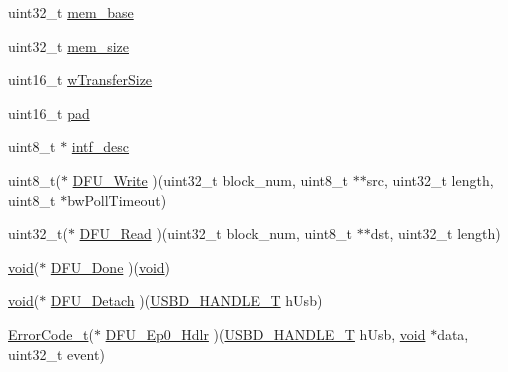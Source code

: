 \begin{DoxyCompactItemize}
\item 
uint32\-\_\-t \hyperlink{structUSBD__DFU__INIT__PARAM_a00d172e271b0f2272b052f479c3d2439}{mem\-\_\-base}
\item 
uint32\-\_\-t \hyperlink{structUSBD__DFU__INIT__PARAM_a4624ef53dbdf39e27314fa7b19d6720d}{mem\-\_\-size}
\item 
uint16\-\_\-t \hyperlink{structUSBD__DFU__INIT__PARAM_a497bbbfa6751823b9e288c257456b56f}{w\-Transfer\-Size}
\item 
uint16\-\_\-t \hyperlink{structUSBD__DFU__INIT__PARAM_a12378565018adc1588b6fd4f12e3a5dc}{pad}
\item 
uint8\-\_\-t $\ast$ \hyperlink{structUSBD__DFU__INIT__PARAM_ac124783c4a9188405cdb87399aa067ce}{intf\-\_\-desc}
\item 
uint8\-\_\-t($\ast$ \hyperlink{structUSBD__DFU__INIT__PARAM_a1494ee2021466b24bcf4f02800be33b2}{D\-F\-U\-\_\-\-Write} )(uint32\-\_\-t block\-\_\-num, uint8\-\_\-t $\ast$$\ast$src, uint32\-\_\-t length, uint8\-\_\-t $\ast$bw\-Poll\-Timeout)
\item 
uint32\-\_\-t($\ast$ \hyperlink{structUSBD__DFU__INIT__PARAM_ad2d13b52a973cf0e83a6bc509b61c46c}{D\-F\-U\-\_\-\-Read} )(uint32\-\_\-t block\-\_\-num, uint8\-\_\-t $\ast$$\ast$dst, uint32\-\_\-t length)
\item 
\hyperlink{Paradigm_2Tern__EE_2small_2portmacro_8h_a14d32f8130d3c0b212cfc751730b5b49}{void}($\ast$ \hyperlink{structUSBD__DFU__INIT__PARAM_acab8981342b48fbc9b53503dd0161f0c}{D\-F\-U\-\_\-\-Done} )(\hyperlink{Paradigm_2Tern__EE_2small_2portmacro_8h_a14d32f8130d3c0b212cfc751730b5b49}{void})
\item 
\hyperlink{Paradigm_2Tern__EE_2small_2portmacro_8h_a14d32f8130d3c0b212cfc751730b5b49}{void}($\ast$ \hyperlink{structUSBD__DFU__INIT__PARAM_aa0bbec57d9bc881b52d406a2911c1ca2}{D\-F\-U\-\_\-\-Detach} )(\hyperlink{group__USBD__Core_gafdbb2204d929cb9d75736bd2b42342ac}{U\-S\-B\-D\-\_\-\-H\-A\-N\-D\-L\-E\-\_\-\-T} h\-Usb)
\item 
\hyperlink{error_8h_a905255056c349318139d94aa4523d516}{Error\-Code\-\_\-t}($\ast$ \hyperlink{structUSBD__DFU__INIT__PARAM_aed01890d2b8be51876c75f4541425529}{D\-F\-U\-\_\-\-Ep0\-\_\-\-Hdlr} )(\hyperlink{group__USBD__Core_gafdbb2204d929cb9d75736bd2b42342ac}{U\-S\-B\-D\-\_\-\-H\-A\-N\-D\-L\-E\-\_\-\-T} h\-Usb, \hyperlink{Paradigm_2Tern__EE_2small_2portmacro_8h_a14d32f8130d3c0b212cfc751730b5b49}{void} $\ast$data, uint32\-\_\-t event)
\end{DoxyCompactItemize}


